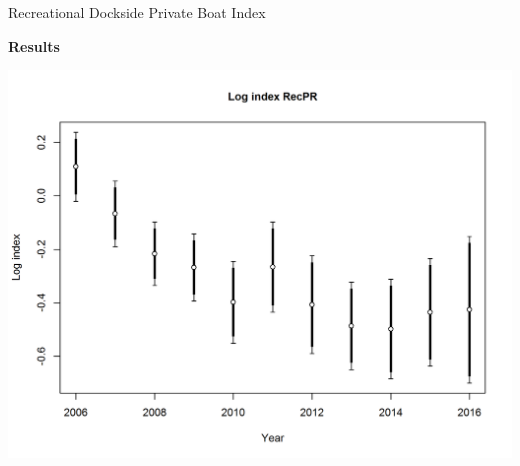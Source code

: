 \documentclass[ignorenonframetext,]{beamer}
\begin{document}
\begin{frame}{Recreational Dockside Private Boat Index}

\textbf{Results}

\centering
\includegraphics{r4ss/plots_mod1/index4_logcpuedata_RecPR.png}

\end{frame}
\end{document}
